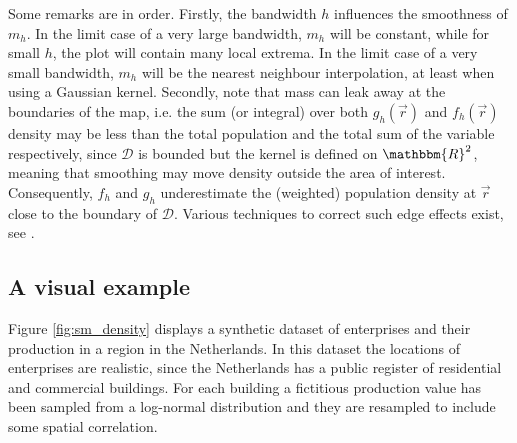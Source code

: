Some remarks are in order. Firstly, the bandwidth $h$ influences the smoothness of $m_h$. In the limit case of a very large bandwidth, $m_h$ will be constant, while for small $h$, the plot will contain many local extrema. In the limit case of a very small bandwidth, $m_h$ will be the nearest neighbour interpolation, at least when using a Gaussian kernel. Secondly, note that mass can leak away at the boundaries of the map, i.e. the sum (or integral) over both $g_h(\vec{r})$ and $f_h(\vec{r})$ density may be less than the total population and the total sum of the variable respectively, since $\mathcal{D}$ is bounded but the kernel is defined on $\mathbbm{R}^2$, meaning that smoothing may move density outside the area of interest. Consequently, $f_h$ and $g_h$ underestimate the (weighted) population density at $\vec{r}$ close to the boundary of $\mathcal{D}$. Various techniques to correct such edge effects exist, see \citet{Berman1989,Diggle1985,Lieshout2012}.

\subsection{A visual example}

Figure \ref{fig:sm_density} displays a synthetic dataset of enterprises and 
their production in a region in the Netherlands. In this dataset the 
locations of enterprises are realistic, since the Netherlands has 
a public register of residential and commercial buildings. For each building
a fictitious production value has been sampled from a log-normal distribution
and they are resampled to include some spatial correlation. 

